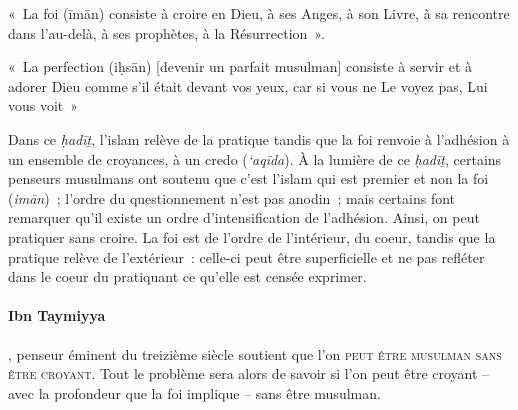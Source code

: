 \begin{Def}[īmān]
«~La foi (īmān) consiste à croire en Dieu, à ses Anges, à son Livre, à
sa rencontre dans l'au-delà, à ses prophètes, à la Résurrection~».
\end{Def}

\begin{Def}[iḥsān]

«~La perfection (iḥsān) {[}devenir un parfait musulman{]} consiste à
servir et à adorer Dieu comme s'il était devant vos yeux, car si vous ne
Le voyez pas, Lui vous voit~»
\end{Def}

Dans ce \emph{ḥadīṯ}, l'islam relève de la pratique tandis que la foi
renvoie à l'adhésion à un ensemble de croyances, à un credo
(\emph{`aqīda}). À la lumière de ce \emph{ḥadīṯ}, certains penseurs
musulmans ont soutenu que c'est l'islam qui est premier et non la foi
(\emph{imān})~; l'ordre du questionnement n'est pas anodin~; mais
certains font remarquer qu'il existe un ordre d'intensification de
l'adhésion. Ainsi, on peut pratiquer sans croire. La foi est de l'ordre
de l'intérieur, du coeur, tandis que la pratique relève de l'extérieur~:
celle-ci peut être superficielle et ne pas refléter dans le coeur du
pratiquant ce qu'elle est censée exprimer.

\FloatBarrier
 \paragraph{Ibn Taymiyya},
penseur éminent du treizième siècle soutient que l'on \textsc{peut être musulman
sans être croyant}. Tout le problème sera alors de savoir si l'on peut
être croyant -- avec la profondeur que la foi implique -- sans être
musulman.

